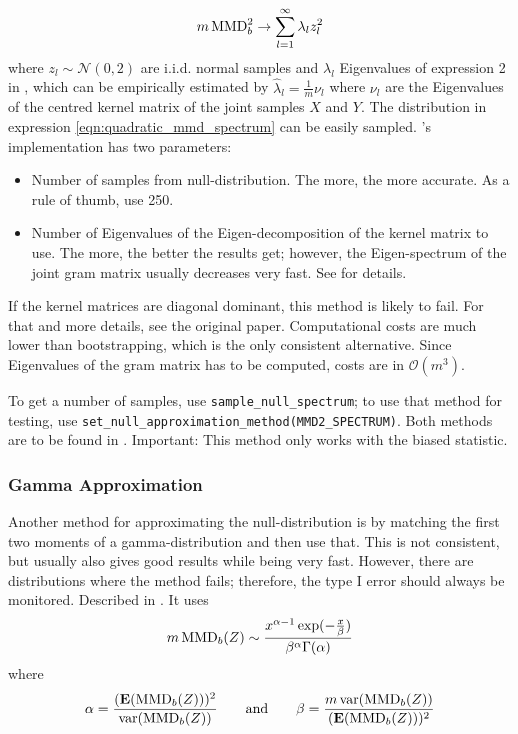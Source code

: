\begin{align}
\label{eqn:quadratic_mmd_spectrum}
m\operatorname{MMD}^2_b \rightarrow \sum_{l=1}^\infty \lambda_l z_l^2
\end{align}
where $z_l\sim \mathcal{N}(0,2)$ are i.i.d. normal samples and $\lambda_l$
Eigenvalues of expression 2 in \citep{Gretton2012b}, which can be empirically
estimated by $\hat\lambda_l=\frac{1}{m}\nu_l$ where $\nu_l$ are the Eigenvalues
of the centred kernel matrix of the joint samples $X$ and $Y$. The distribution
in expression \ref{eqn:quadratic_mmd_spectrum} can be easily sampled. \shogun{}'s implementation has two parameters:
\begin{itemize}
\item Number of samples from null-distribution. The more, the more accurate. As a rule of thumb, use 250.
\item Number of Eigenvalues of the Eigen-decomposition of the kernel matrix to use. The more, the better the results get; however, the Eigen-spectrum of the joint gram matrix usually decreases very fast. See \citep{Gretton2012b} for details.
\end{itemize}
If the kernel matrices are diagonal dominant, this method is likely to fail. For that and more details, see the original paper. Computational costs are much lower than bootstrapping, which is the only consistent alternative. Since Eigenvalues of the gram matrix has to be computed, costs are in $\mathcal{O}(m^3)$.

To get a number of samples, use \texttt{sample\_null\_spectrum}; to use that method for testing, use \texttt{set\_null\_approximation\_method(MMD2\_SPECTRUM)}. Both methods are to be found in . Important: This method only works with the biased statistic.
\subsubsection{Gamma Approximation}
Another method for approximating the null-distribution is by matching the first two moments of a gamma-distribution and then use that. This is not consistent, but usually also gives good results while being very fast. However, there are distributions where the method fails; therefore, the type I error should always be monitored. Described in \citep{Gretton2012b}. It uses
\begin{align}
\label{eqn:quadratic_mmd_gamma}
m\operatorname{MMD}_b(Z) \sim \frac{x^{\alpha-1}\exp(-\frac{x}{\beta})}{\beta^\alpha \Gamma(\alpha)}
\end{align}
where
\begin{align*}
\alpha=\frac{(\textbf{E}(\text{MMD}_b(Z)))^2}{\operatorname{var}(\text{MMD}_b(Z))} \qquad \text{and} \qquad
 \beta=\frac{m \operatorname{var}(\text{MMD}_b(Z))}{(\textbf{E}(\text{MMD}_b(Z)))^2}
\end{align*}

